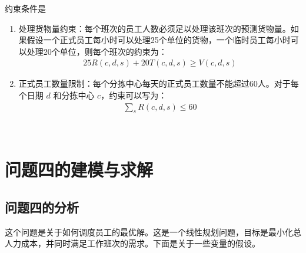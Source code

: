 \documentclass[UTF8]{article}%
\begin{document}
约束条件是
\begin{enumerate}
    \item 处理货物量约束：每个班次的员工人数必须足以处理该班次的预测货物量。如果假设一个正式员工每小时可以处理25个单位的货物，一个临时员工每小时可以处理20个单位，则每个班次的约束为：\begin{align*}
        25R(c,d,s)+20 T(c,d,s)\geq V(c,d,s)
    \end{align*}
    \item 正式员工数量限制：每个分拣中心每天的正式员工数量不能超过60人。对于每个日期 
    $d$ 和分拣中心 
    $c$，约束可以写为：\begin{align*}
        \sum_s R(c,d,s)\leq 60
    \end{align*}
\end{enumerate}

\


\section{问题四的建模与求解}

\subsection{问题四的分析}

这个问题是关于如何调度员工的最优解。这是一个线性规划问题，目标是最小化总人力成本，并同时满足工作班次的需求。下面是关于一些变量的假设。
\end{document}
